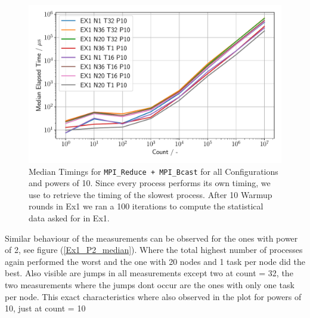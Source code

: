 \begin{figure}[h]
    \begin{center}
        \includegraphics[width=1.0\linewidth]{figures/Ex1_1.pdf}

        \caption{Median Timings for \texttt{MPI\_Reduce + MPI\_Bcast} for all Configurations 
        and powers of 10. Since every  process performs its own timing, we use 
         to retrieve the timing of the slowest process. After 10 Warmup rounds 
        in Ex1 we ran a 100 iterations to compute the statistical data asked for in Ex1.}

        \label{Ex1_P10_median}
    \end{center}
\end{figure}

Similar behaviour of the measurements can be observed for the ones with power of 2, see figure (\ref{Ex1_P2_median}).
Where the total highest number of \MPI processes again performed the worst and the one with 20 nodes and 1 task per 
node did the best. Also visible are jumps in all measurements except two at count = 32, the two measurements where the
jumps dont occur are the ones with only one task per node. This exact characteristics where also observed in the plot
for powers of 10, just at count = 10


